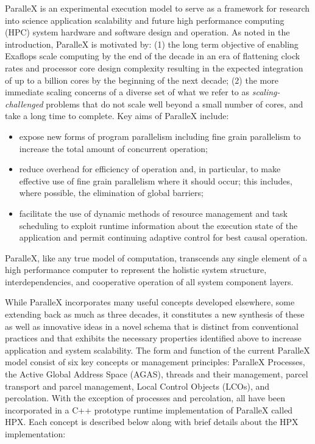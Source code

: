 \documentclass{revtex4}
\begin{document}
ParalleX is an experimental execution model to serve as a framework 
for research into science application scalability and future 
high performance computing (HPC) system hardware and software design and
operation.
As noted in the introduction, ParalleX is motivated by: (1) the long term objective of enabling Exaflops
scale computing by the end of the decade in an era of flattening clock
rates and processor core design complexity resulting in the expected
integration of up to a billion cores by the beginning of the next
decade; (2) the more immediate scaling concerns of a diverse set of
what we refer to as \textit{scaling-challenged} problems that do not
scale well beyond a small number of cores, and take a long time to complete.
Key aims of ParalleX include:
\begin{itemize}
\item expose new forms of program parallelism including fine grain
  parallelism to increase the total amount of concurrent operation;
\item reduce overhead for efficiency of operation and, in particular, to
  make effective use of fine grain parallelism where it should
  occur; this includes, where possible, the elimination of global barriers;
\item facilitate the use of dynamic methods of resource management and
  task scheduling to exploit runtime information about the execution
  state of the application and permit continuing adaptive control for
  best causal operation.
\end{itemize}
ParalleX, like any true model of computation, transcends any single element of a high 
performance computer to represent the holistic system structure, interdependencies, 
and cooperative operation of all system component layers. 

While ParalleX incorporates many useful concepts developed
elsewhere, some extending back as much as three decades, it
constitutes a new synthesis of these as well as innovative ideas in a
novel schema that is distinct from conventional practices and that
exhibits the necessary properties identified above to increase
application and system scalability.
The form and function of the current ParalleX model consist of six key concepts
or management principles: ParalleX Processes, the Active Global Address Space (AGAS), threads and
their management, parcel transport and parcel management, Local Control Objects (LCOs),
and percolation.  With the exception of processes and percolation, all have been incorporated
in a C++ prototype runtime implementation of ParalleX called HPX.   Each concept is described below
along with brief details about the HPX implementation:
\end{document}
